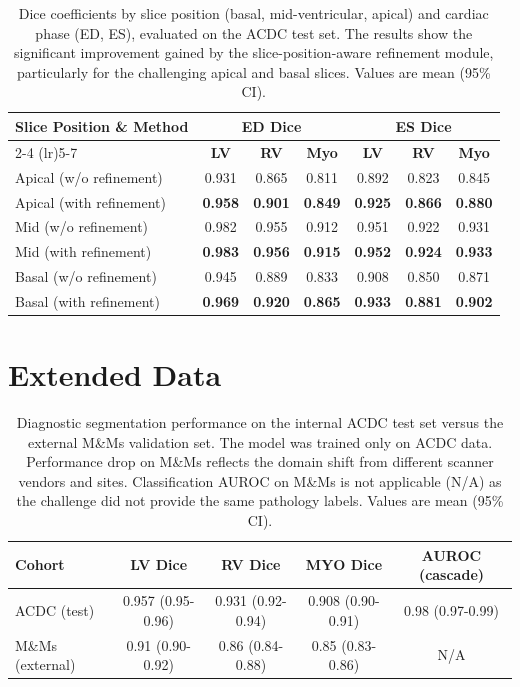 \documentclass[fleqn,10pt]{wlscirep}
\begin{document}
\begin{table}[!htbp]
  \centering
  \caption{Dice coefficients by slice position (basal, mid-ventricular, apical) and cardiac phase (ED, ES), evaluated on the ACDC test set. The results show the significant improvement gained by the slice-position-aware refinement module, particularly for the challenging apical and basal slices. Values are mean (95\% CI).}
  \label{tab:apical_basal_performance}
  \begin{tabular}{lcccccc}
    \toprule
    \multirow{2}{*}{\textbf{Slice Position \& Method}} & \multicolumn{3}{c}{\textbf{ED Dice}} & \multicolumn{3}{c}{\textbf{ES Dice}} \\
    \cmidrule(lr){2-4} \cmidrule(lr){5-7}
    & \textbf{LV} & \textbf{RV} & \textbf{Myo} & \textbf{LV} & \textbf{RV} & \textbf{Myo} \\
    \midrule
    Apical (w/o refinement) & 0.931 & 0.865 & 0.811 & 0.892 & 0.823 & 0.845 \\
    Apical (with refinement) & \textbf{0.958} & \textbf{0.901} & \textbf{0.849} & \textbf{0.925} & \textbf{0.866} & \textbf{0.880} \\
    \midrule
    Mid (w/o refinement) & 0.982 & 0.955 & 0.912 & 0.951 & 0.922 & 0.931 \\
    Mid (with refinement) & \textbf{0.983} & \textbf{0.956} & \textbf{0.915} & \textbf{0.952} & \textbf{0.924} & \textbf{0.933} \\
    \midrule
    Basal (w/o refinement) & 0.945 & 0.889 & 0.833 & 0.908 & 0.850 & 0.871 \\
    Basal (with refinement) & \textbf{0.969} & \textbf{0.920} & \textbf{0.865} & \textbf{0.933} & \textbf{0.881} & \textbf{0.902} \\
    \bottomrule
  \end{tabular}
\end{table}

\section*{Extended Data}
\renewcommand{\thetable}{E\arabic{table}}
\setcounter{table}{0}


\begin{table}[!htbp]
  \caption{Diagnostic segmentation performance on the internal ACDC test set versus the external M\&Ms validation set. The model was trained only on ACDC data. Performance drop on M\&Ms reflects the domain shift from different scanner vendors and sites. Classification AUROC on M\&Ms is not applicable (N/A) as the challenge did not provide the same pathology labels. Values are mean (95\% CI).}
  \label{tab:performance}
  \centering
  \begin{tabular}{lcccc}
    \toprule
    Cohort & LV Dice & RV Dice & MYO Dice & AUROC (cascade) \\
    \midrule
    ACDC (test) & 0.957 (0.95-0.96) & 0.931 (0.92-0.94) & 0.908 (0.90-0.91) & 0.98 (0.97-0.99) \\
    M\&Ms (external) & 0.91 (0.90-0.92) & 0.86 (0.84-0.88) & 0.85 (0.83-0.86) & N/A \\
    \bottomrule
  \end{tabular}
\end{table}
\end{document}
